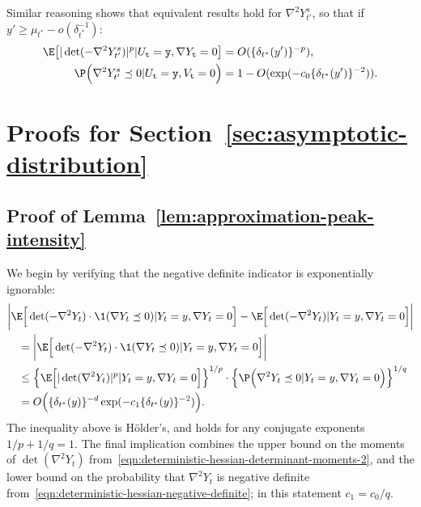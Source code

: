 \documentclass{article}
\begin{document}
	Similar reasoning shows that equivalent results hold for $\nabla^2 Y_{t'}^s$, so that if $y' \geq \mu_{t^*} - o(\delta_{t^*}^{-1})$:
	\begin{equation}
		\label{eqn:randomized-kac-rice-hessian-moments-2}
		\begin{aligned}
			\E\big[|\det(-\nabla^2 Y_{t'}^s)|^p|U_{{\tt t}} = {\tt y},\nabla Y_{{\tt t}} = 0\big] 
			& = 
			O(\{\delta_{t^*}(y')\}^{-p}),  \\
			\P\Big(\nabla^2 Y_{t'}^s \preceq  0|U_{{\tt t}} = {\tt y}, V_{{\tt t}} = 0\Big) 
			& = 
			1 - O(\exp(-c_0\{\delta_{t^*}(y')\}^{-2})).
		\end{aligned}
	\end{equation}
	
	\section{Proofs for Section~\ref{sec:asymptotic-distribution}}
	
	\subsection{Proof of Lemma~\ref{lem:approximation-peak-intensity}}
	\label{subsec:pf-approximation-peak-intensity}
	We begin by verifying that the negative definite indicator is exponentially ignorable:
	\begin{equation}
		\label{pf:approximation-peak-intensity-1}
		\begin{aligned}
			& \bigg|\E\Big[\det(-\nabla^2 Y_t) \cdot \1(\nabla Y_t \preceq 0)|Y_t = y,\nabla Y_t = 0\Big] - \E\Big[\det(-\nabla^2 Y_t)|Y_t = y,\nabla Y_t = 0\Big]\bigg| \\
			& \quad = \bigg|\E\Big[\det(-\nabla^2 Y_t) \cdot \1(\nabla Y_t \preceq 0)|Y_t = y,\nabla Y_t = 0\Big]\bigg| \\
			& \quad \leq \Big\{\E\Big[|\det(\nabla^2 Y_t)|^{p}|Y_t = y,\nabla Y_t = 0\Big]\Big\}^{1/p} \cdot \Big\{\P\Big(\nabla^2 Y_t \preceq 0|Y_t = y,\nabla Y_t = 0\Big)\Big\}^{1/q} \\
			& \quad = O\Big(\{\delta_{t^*}(y)\}^{-d} \exp(-c_1 \{\delta_{t^*}(y)\}^{-2})\Big).
		\end{aligned}
	\end{equation}
	The inequality above is H\"{o}lder's, and holds for any conjugate exponents $1/p + 1/q = 1$. The final implication combines the upper bound on the moments of $\det(\nabla^2 Y_t)$ from~\eqref{eqn:deterministic-hessian-determinant-moments-2}, and the lower bound on the probability that $\nabla^2 Y_t$ is negative definite from~\eqref{eqn:deterministic-hessian-negative-definite}; in this statement $c_1 = c_0/q$. 
	
\end{document}
